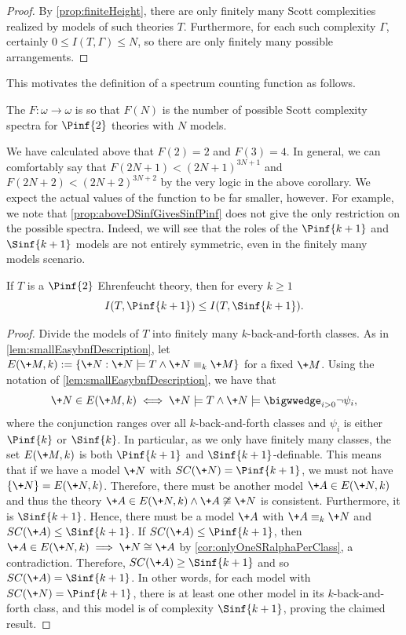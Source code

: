 \documentclass[10pt,a4paper]{amsart}
\renewcommand{\-}{\text{-}}
\begin{document}
\begin{proof}
By \cref{prop:finiteHeight}, there are only finitely many Scott complexities realized by models of such theories $T$.
Furthermore, for each such complexity $\Gamma$, certainly $0\leq I(T,\Gamma)\leq N$, so there are only finitely many possible arrangements.
\end{proof}

This motivates the definition of a spectrum counting function as follows.

\begin{definition}
  The  $F:\omega\to\omega$ is so that $F(N)$ is the number of possible Scott complexity spectra for $\Pinf{2}$ theories with $N$ models.
\end{definition}

We have calculated above that $F(2)=2$ and $F(3)=4$.
In general, we can comfortably say that $F(2N+1)<(2N+1)^{3N+1}$ and $F(2N+2)<(2N+2)^{3N+2}$ by the very logic in the above corollary.
We expect the actual values of the function to be far smaller, however.
For example, we note that \cref{prop:aboveDSinfGivesSinfPinf} does not give the only restriction on the possible spectra.
Indeed, we will see that the roles of the $\Pinf{k+1}$ and $\Sinf{k+1}$ models are not entirely symmetric, even in the finitely many models scenario.

\begin{proposition}\label{prop:finiteSpectralInequality}
If $T$ is a $\Pinf{2}$ Ehrenfeucht theory, then for every $k\geq1$
\[I(T,\Pinf{k+1}) \leq I(T,\Sinf{k+1}).\]
\end{proposition}

\begin{proof}
Divide the models of $T$ into finitely many $k$-back-and-forth classes.
As in \cref{lem:smallEasybnfDescription}, let $E(\+M,k):=\{\+N : \+N\models T \land \+N\equiv_k \+M\}$ for a fixed $\+M$.
Using the notation of \cref{lem:smallEasybnfDescription}, we have that 
\[\+N\in E(\+M,k) \iff \+N \models T \land \+N\models\bigwwedge_{i>0} \lnot\psi_i,\]
where the conjunction ranges over all $k$-back-and-forth classes and $\psi_i$ is either $\Pinf{k}$ or $\Sinf{k}$.
In particular, as we only have finitely many classes, the set $E(\+M,k)$ is both $\Pinf{k+1}$ and $\Sinf{k+1}$-definable.
This means that if we have a model $\+N$ with $SC(\+N)=\Pinf{k+1}$, we must not have $\{\+N\}=E(\+N,k)$.
Therefore, there must be another model $\+A\in E(\+N,k)$ and thus the theory $\+A\in E(\+N,k)\land \+A\not\cong \+N$ is consistent. Furthermore, it is $\Sinf{k+1}$.
Hence, there must be a model $\+A$ with $\+A\equiv_k \+N$ and $SC(\+A)\leq\Sinf{k+1}$.
If $SC(\+A)\leq\Pinf{k+1}$, then $\+A\in E(\+N,k)\implies \+N\cong \+A$ by \cref{cor:onlyOneSRalphaPerClass}, a contradiction.
Therefore, $SC(\+A)\geq\Sinf{k+1}$ and so $SC(\+A)=\Sinf{k+1}$.
In other words, for each model with $SC(\+N)=\Pinf{k+1}$, there is at least one other model in its $k$-back-and-forth class, and this model is of complexity $\Sinf{k+1}$, proving the claimed result.
\end{proof}
\end{document}
